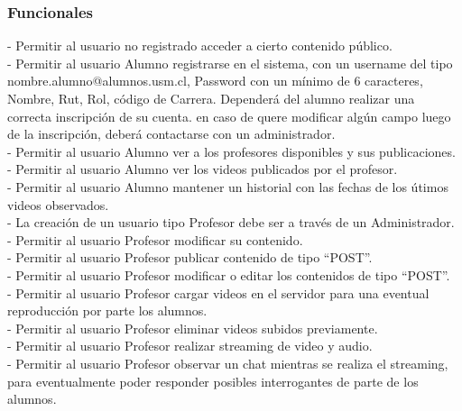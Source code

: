 \documentclass[12pt]{article}
\begin{document}
\subsubsection{Funcionales}

- Permitir al usuario no registrado acceder a cierto contenido público.\\

- Permitir al usuario Alumno registrarse en el sistema, con un username del tipo nombre.alumno@alumnos.usm.cl,
	Password con un mínimo de 6 caracteres, Nombre, Rut, Rol, código de Carrera. Dependerá del alumno realizar
	una correcta inscripción de su cuenta. en caso de quere modificar algún campo luego de la inscripción,
	deberá contactarse con un administrador.\\

- Permitir al usuario Alumno ver a los profesores disponibles y sus publicaciones.\\

- Permitir al usuario Alumno ver los videos publicados por el profesor.\\

- Permitir al usuario Alumno mantener un historial con las fechas de los útimos videos observados.\\ 

- La creación de un usuario tipo Profesor debe ser a través de un Administrador.\\

- Permitir al usuario Profesor modificar su contenido.\\

- Permitir al usuario Profesor publicar contenido de tipo ``POST''.\\

- Permitir al usuario Profesor modificar o editar los contenidos de tipo ``POST''.\\

- Permitir al usuario Profesor cargar videos en el servidor para una eventual reproducción por parte los
	alumnos.\\

- Permitir al usuario Profesor eliminar videos subidos previamente.\\

- Permitir al usuario Profesor realizar streaming de video y audio.\\

- Permitir al usuario Profesor observar un chat mientras se realiza el streaming, para eventualmente 
	poder responder posibles interrogantes de parte de los alumnos.\\
\end{document}
